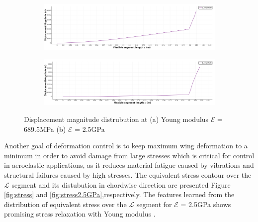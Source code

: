 \begin{figure}[hbt!]
\centering
\begin{subfigure}{.8\textwidth}
    \includegraphics[width=5in]{Figures/DispMAgnitude689MPa.png}
  \caption{\label{fig:dispMagni689.5MPa}}
\end{subfigure}
\begin{subfigure}{.8\textwidth}
    \includegraphics[width=5in]{Figures/DispMAgnitude25GPa.png}
  \caption{\label{fig:deflection2.5GPa}}
\end{subfigure}
\caption{\label{fig:displ} Displacement magnitude distrubution at (a) Young modulus $\mathcal{E}$ = 689.5MPa  (b) $\mathcal{E}$ = 2.5GPa }
  \end{figure}

Another goal of deformation control is to keep maximum wing deformation to a minimum in order to avoid damage from large stresses which is critical for control in aeroelastic applications, as it reduces material fatigue caused by vibrations and structural failures caused by high stresses.
The equivalent stress contour over the $\mathcal{L}$ segment and its distubution in chordwise direction are presented Figure \ref{fig:stress} and \ref{fig:stress2.5GPa},respectively. The features learned from the distribution of equivalent stress over the $\mathcal{L}$ segment for $\mathcal{E}$ = 2.5GPa shows promising stress relaxation with Young modulus .

